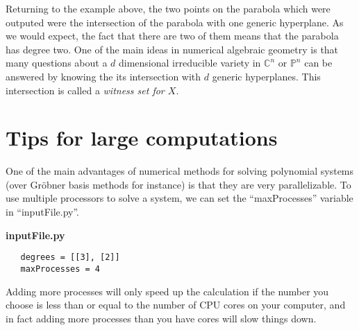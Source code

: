 \documentclass[12pt]{article}
\theoremstyle{definition}
\newcommand{\C}{\mathbb{C}}
\newcommand{\PP}{\mathbb{P}}
\begin{document}
Returning to the example above, the two points on the parabola which 
were outputed were the intersection of the parabola with one generic 
hyperplane. As we would expect, the fact that there are two of them 
means that the parabola has degree two. One of the main ideas 
in numerical algebraic geometry is that many questions about a $d$ 
dimensional irreducible variety in $\C^n$ or $\PP^n$ can be answered by knowing the 
its intersection with $d$ generic hyperplanes. This intersection is 
called a \emph{witness set for $X$}. 


\section{Tips for large computations}

One of the main advantages of numerical methods for solving polynomial 
systems (over Gr\"{o}bner basis methods for instance) is that they are 
very parallelizable. To use multiple processors to solve a system, we 
can set the ``maxProcesses'' variable in ``inputFile.py''.

\noindent \textbf{inputFile.py}
\begin{leftbar}
\vspace{-10pt} 
\begin{verbatim}
   degrees = [[3], [2]]
   maxProcesses = 4
\end{verbatim}\vspace{-10pt} 
\end{leftbar}

Adding more processes will only speed up the calculation if the number 
you choose is less than or equal to the number of CPU cores on your 
computer, and in fact adding more processes than you have cores will 
slow things down.
\end{document}
